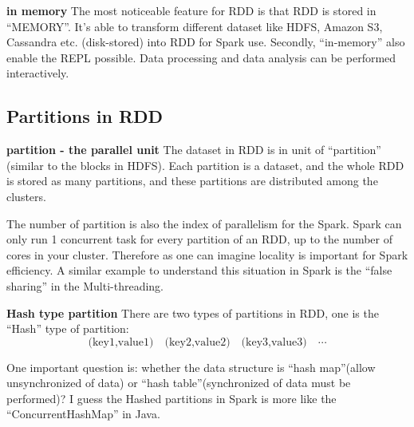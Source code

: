 \documentclass[notheorems, aspectratio=54]{beamer}
\begin{document}
\begin{frame}

\begin{block}{\textbf{in memory}}
 The most noticeable feature for RDD is that RDD is stored in ``MEMORY''. It's able to transform
 different dataset like HDFS, Amazon S3, Cassandra etc. (disk-stored) into RDD for Spark use. Secondly, ``in-memory'' also enable the 
 REPL possible. Data processing and data analysis can be performed interactively. 
\end{block}


 
\end{frame}


\subsection{Partitions in RDD}
\begin{frame}

\begin{block}{\textbf{partition - the parallel unit}}
 The dataset in RDD is in unit of ``partition'' (similar to the blocks in HDFS). Each partition is a dataset, and the whole RDD is stored as 
 many partitions, and these partitions are distributed among the clusters.
 
 The number of partition is also the index of parallelism for the Spark. Spark can only run 1 concurrent task for every partition of an RDD, 
 up to the number of cores in your cluster. Therefore as one can imagine locality is important for Spark efficiency. A similar example to 
 understand this situation in Spark is the ``false sharing'' in the Multi-threading.
\end{block}
 
\end{frame}

\begin{frame}

\begin{block}{\textbf{Hash type partition}}
 There are two types of partitions in RDD, one is the ``Hash'' type of partition:
 \begin{displaymath}
  \text{(key1,value1)}  \quad \text{(key2,value2)} \quad \text{(key3,value3)}  \quad \cdots
 \end{displaymath}
\end{block}

One important question is: whether the data structure is ``hash map''(allow unsynchronized of data) or ``hash table''(synchronized of data
must be performed)? I guess the Hashed partitions in Spark is more like the ``ConcurrentHashMap'' in Java.  
 
\end{frame}
\end{document}
